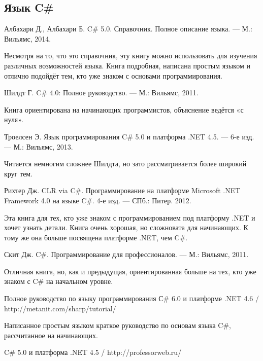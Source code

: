
\begingroup
\renewcommand{\section}[2]{}%
\begin{thebibliography}{99}

  \subsection*{Язык C\#}

  Албахари Д., Албахари Б. C\# 5.0. Справочник. Полное описание языка. — М.: Вильямс, 2014.

  Несмотря на то, что это справочник, эту книгу можно использовать для
  изучения различных возможностей языка. Книга подробная, написана
  простым языком и отлично подойдёт тем, кто уже знаком с основами
  программирования.

  Шилдт Г. C\# 4.0: Полное руководство. — М.: Вильямс, 2011.

  Книга ориентирована на начинающих программистов, объяснение ведётся
  «с нуля».

  Троелсен Э. Язык программирования C\# 5.0 и платформа .NET 4.5. — 6-е изд. — М.: Вильямс, 2013.

  Читается немногим сложнее Шилдта, но зато рассматривается более
  широкий круг тем.
  
  Рихтер Дж. CLR via C\#. Программирование на платформе Microsoft .NET Framework 4.0 на языке C\#. 4-е изд. — СПб.: Питер. 2012.

  Эта книга для тех, кто уже знаком с программированием под платформу
  .NET и хочет узнать детали. Книга очень хорошая, но сложновата для
  начинающих. К тому же она больше посвящена платформе .NET, чем C\#.

  Скит Дж. C\#. Программирование для профессионалов. — М.: Вильямс, 2011.

  Отличная книга, но, как и предыдущая, ориентированная больше на тех,
  кто уже знаком с C\# на начальном уровне.

  Полное руководство по языку программирования С\# 6.0 и платформе .NET 4.6 / http://metanit.com/sharp/tutorial/

  Написанное простым языком краткое руководство по основам языка C\#,
  рассчитанное на начинающих.

  C\# 5.0 и платформа .NET 4.5 / http://professorweb.ru/


\end{thebibliography}
